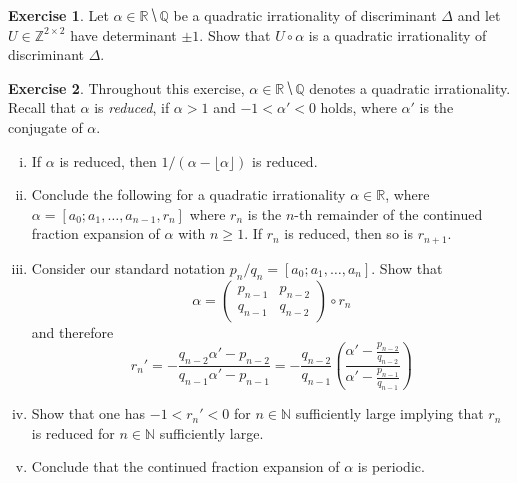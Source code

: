 \documentclass[12pt,a4paper]{article}
\theoremstyle{plain}
\newtheorem*{Sol*}{Solution}
\theoremstyle{definition}
\newtheorem{Ex}{Exercise}
\def \Q {\mathbb Q}
\def \R {\mathbb R}
\def \Z {\mathbb Z}
\newif\ifsolutions
\newcommand{\exercise}[2]{
			\begin{Ex} #1 \end{Ex}
			\ifsolutions  \begin{Sol*} #2 \end{Sol*} \bigskip \else \bigskip  \fi
		}
\begin{document}
\exercise{
Let $α ∈ℝ ⧹ℚ$ be a quadratic irrationality of discriminant $Δ$ and let $U ∈ ℤ^{2 × 2}$ have determinant $\pm 1$. Show that $U \circ α$ is a quadratic irrationality of discriminant $Δ$. 

}{}

\exercise{Throughout this exercise, $α ∈ ℝ ⧹ℚ$ denotes a quadratic irrationality. 
  Recall that  $α$ is \emph{reduced}, if $α>1$ and $-1 < α'<0$ holds, where $α'$ is the conjugate of $α$.
  \begin{enumerate}[i)] 
  \item If  $α$ is reduced, then $1 / (α - ⌊α⌋)$ is reduced.
  \item Conclude the following for a quadratic irrationality $α ∈ ℝ$, where $α = [a_0 ; a_1, \dots, a_{n-1}, r_n]$ where $r_n$ is the $n$-th remainder of the continued fraction expansion of $α$ with $n≥1$. If $r_n$ is reduced, then so is $r_{n+1}$.
  \item Consider our standard notation $p_{n}/ q_n = [a_0;a_1,\dots,a_n]$. 
    Show that
    \begin{displaymath}
      α =
      \begin{pmatrix}
        p_{n-1} & p_{n-2} \\
        q_{n-1} & q_{n-2} 
      \end{pmatrix} \circ r_n
    \end{displaymath}
    and therefore
    \begin{displaymath}
      r_n ' = - \frac{q_{n-2} α' - p_{n-2}}{ q_{n-1} α' - p_{n-1}} = - \frac{q_{n-2}}{q_{n-1}} \left( \frac{α' - \frac{p_{n-2}}{ q_{n-2}}}{α' - \frac{p_{n-1} }{ q_{n-1}} }\right)
    \end{displaymath}
  \item Show that one has $-1 < r_n' <0$  for $n ∈ ℕ$  sufficiently large implying that $r_n$ is reduced for $n ∈ ℕ$  sufficiently large.
    \item Conclude that the continued fraction  expansion of $α $  is periodic. 
  \end{enumerate}
}{}


\end{document}

